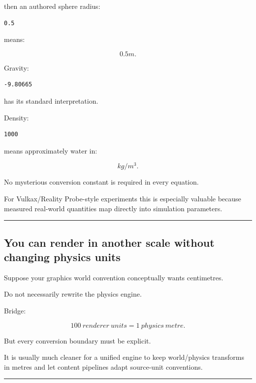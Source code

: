 then an authored sphere radius:

\begin{verbatim}
0.5
\end{verbatim}

means:

\[
0.5m.
\]

Gravity:

\begin{verbatim}
-9.80665
\end{verbatim}

has its standard interpretation.

Density:

\begin{verbatim}
1000
\end{verbatim}

means approximately water in:

\[
kg/m^3.
\]

No mysterious conversion constant is required in every equation.

For Vulkax/Reality Probe-style experiments this is especially valuable because measured real-world quantities map directly into simulation parameters.

\begin{center}\rule{0.5\linewidth}{0.5pt}\end{center}

\subsection{You can render in another scale without changing physics units}\label{06-engine-ii-ch039-you-can-render-in-another-scale-without-changing-physics-units}

\hypertarget{06-engine-ii-ch039-you-can-render-in-another-scale-without-changing-physics-units}{}

Suppose your graphics world convention conceptually wants centimetres.

Do not necessarily rewrite the physics engine.

Bridge:

\[
100\ renderer\ units
=
1\ physics\ metre.
\]

But every conversion boundary must be explicit.

It is usually much cleaner for a unified engine to keep world/physics transforms in metres and let content pipelines adapt source-unit conventions.

\begin{center}\rule{0.5\linewidth}{0.5pt}\end{center}

